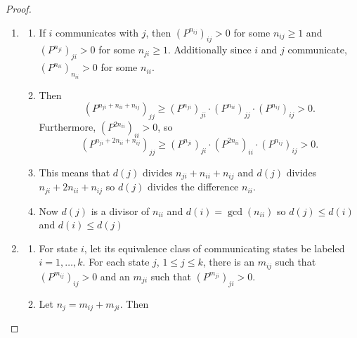 \documentclass[12pt]{article}
\begin{document}
\begin{proof}
    \begin{enumerate}
        \item
            \begin{enumerate}
                \item
                    If \( i \) communicates with \( j \), then \( (P^{n_
                    {ij}})_{ij} > 0 \) for some \( n_{ij} \ge 1 \) and \(
                    (P^{n_{ji}})_{ji} > 0 \) for some \( n_{ji} \ge 1 \).
                    Additionally since \( i \) and \( j \) communicate, \(
                    (P^{n_{ii}})_{n_{ii}} > 0 \) for some \( n_{ii} \).
                \item
                    Then
                    \[
                        (P^{n_{ji} + n_{ii} + n_{ij}})_{jj} \ge (P^{n_{ji}})_
                        {ji} \cdot (P^{n_{ii}})_{jj} \cdot (P^{n_{ij}})_
                        {ij} > 0.
                    \] Furthermore, \( (P^{2n_{ii}})_{ii} > 0 \), so
                    \[
                        (P^{n_{ji} + 2n_{ii} + n_{ij}})_{jj} \ge (P^{n_{ji}})_
                        {ji} \cdot (P^{2n_{ii}})_{ii} \cdot (P^{n_{ij}})_
                        {ij} > 0.
                    \]
                \item
                    This means that \( d(j) \) divides \( n_{ji} + n_{ii}
                    + n_{ij} \) and \( d(j) \) divides \( n_{ji} + 2n_{ii}
                    + n_{ij} \) so \( d(j) \) divides the difference \(
                    n_{ii} \).
                \item
                    Now \( d(j) \) is a divisor of \( n_{ii} \) and \( d
                    (i) = \gcd(n_{ii}) \) so \( d(j) \le d(i) \) and \(
                    d(i) \le d(j) \)
            \end{enumerate}
        \item
            \begin{enumerate}
                \item
                    For state \( i \), let its equivalence class of
                    communicating states be labeled \( i = 1, \dots, k \).
                    For each state \( j \), \( 1 \le j \le k \), there
                    is an \( m_{ij} \) such that \( (P^{m_{ij}})_{ij} >
                    0 \) and an \( m_{ji} \) such that \( (P^{m_{ji}})_{ji}
                    > 0 \).
                \item
                    Let \( n_j = m_{ij} + m_{ji} \).  Then
                    \[
\]
\end{enumerate}
\end{enumerate}
\end{proof}
\end{document}
